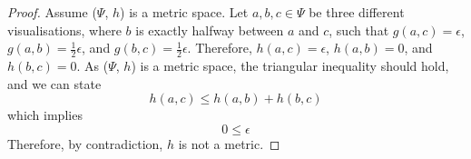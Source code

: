 \documentclass[
  12pt]{article}
\theoremstyle{plain}
\theoremstyle{remark}
\begin{document}
\begin{proof}
Assume (\(\Psi\), \(h\)) is a metric space. Let \(a,b,c \in \Psi\) be
three different visualisations, where \(b\) is exactly halfway between
\(a\) and \(c\), such that \(g(a, c) =  \epsilon\),
\(g(a,b) = \frac {1}{2} \epsilon\), and
\(g(b, c) = \frac {1}{2} \epsilon\). Therefore, \(h(a, c) =  \epsilon\),
\(h(a,b) = 0\), and \(h(b, c) = 0\). As (\(\Psi\), \(h\)) is a metric
space, the triangular inequality should hold, and we can state
\[h(a, c) \leq h(a,b) + h(b, c)\] which implies \[0 \leq \epsilon\]
Therefore, by contradiction, \(h\) is not a metric.
\end{proof}



\end{document}
